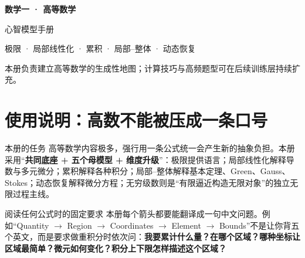 \documentclass[11pt,a4paper,openany]{ctexbook}
\newcommand{\key}[1]{\textbf{\color{deep}#1}}\newcommand{\eng}[1]{\textit{#1}}\let\cleardoublepage\clearpage
\begin{document}
\frontmatter
\begin{titlepage}\centering\vspace*{1.2cm}
{\Huge\bfseries\color{deep} 数学一 · 高等数学\par}\vspace{0.4cm}
{\LARGE 心智模型手册\par}\vspace{0.55cm}
{\large 极限 · 局部线性化 · 累积 · 局部--整体 · 动态恢复\par}\vspace{1.1cm}
\vfill{\small 本册负责建立高等数学的生成性地图；计算技巧与高频题型可在后续训练层持续扩充。\par}
\end{titlepage}
\chapter*{使用说明：高数不能被压成一条口号}
\begin{corebox}{本册的任务}
高等数学内容极多，强行用一条公式统一会产生新的抽象负担。本册采用“\key{共同底座 + 五个母模型 + 维度升级}”：极限提供语言；局部线性化解释导数与多元微分；累积解释各种积分；局部--整体解释基本定理、Green、Gauss、Stokes；动态恢复解释微分方程；无穷级数则是“有限逼近构造无限对象”的独立无限过程主线。
\end{corebox}
\begin{methodbox}{阅读任何公式时的固定要求}
本册每个箭头都要能翻译成一句中文问题。例如“Quantity $\to$ Region $\to$ Coordinates $\to$ Element $\to$ Bounds”不是让你背五个英文，而是要求做重积分时依次问：\key{我要累计什么量？在哪个区域？哪种坐标让区域最简单？微元如何变化？积分上下限怎样描述这个区域？}
\end{methodbox}
\tableofcontents\mainmatter
\end{document}
